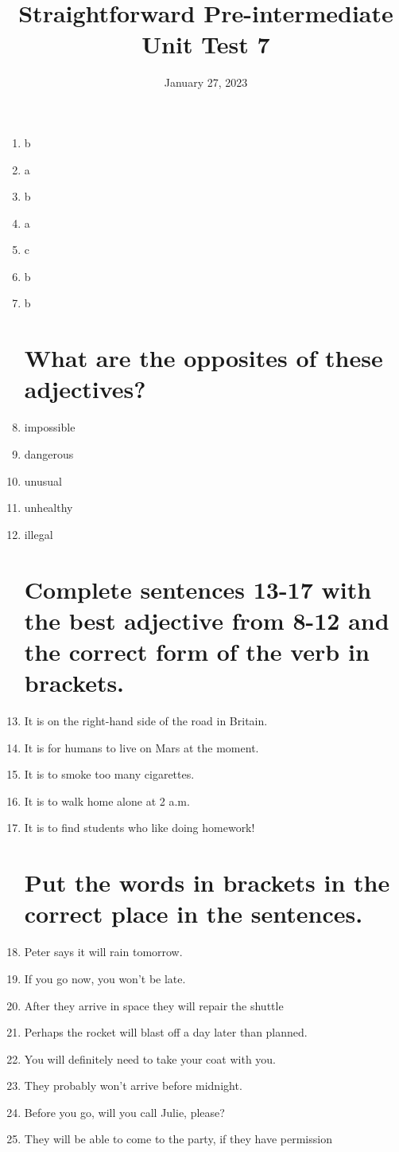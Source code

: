 \documentclass[a5paper, 10pt, final]{extreport}
\title{Straightforward Pre-intermediate Unit Test 7}
\date{January 27, 2023}
\begin{document}
\maketitlepage

\begin{enumerate}
\section{Choose the best word a, b, or c to complete 1–7.}
\item b
\item a
\item b
\item a
\item c
\item b
\item b

\section{What are the opposites of these adjectives?}
\item impossible
\item dangerous
\item unusual
\item unhealthy
\item illegal

\section{Complete sentences 13-17 with the best adjective from 8-12 and the correct form of the verb in brackets.}
\item It is  on the right-hand side of the road in Britain.
\item It is  for humans to live on Mars at the moment.
\item It is  to smoke too many cigarettes.
\item It is  to walk home alone at 2 a.m.
\item It is  to find students who like doing homework!

\section{Put the words in brackets in the correct place in the sentences.}
\item Peter says it will rain tomorrow.
\item If you go now, you won't be late.
\item After they arrive in space they will repair the shuttle
\item Perhaps the rocket will blast off a day later than planned.
\item You will definitely need to take your coat with you.
\item They probably won't arrive before midnight.
\item Before you go, will you call Julie, please?
\item They will be able to come to the party, if they have permission


\end{enumerate}
\end{document}
